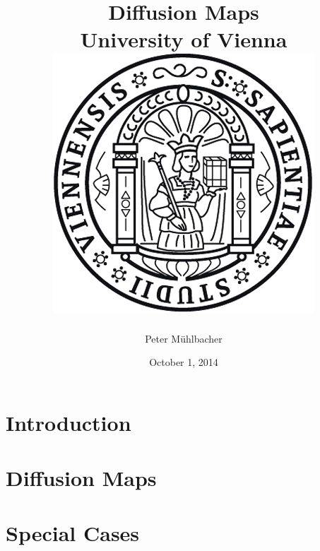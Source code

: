 \documentclass[11pt]{report}
\begin{document}
\title{
	{Diffusion Maps}\\
	{\large University of Vienna}\\
	{\includegraphics{university.png}}
}
\author{Peter Mühlbacher}
\date{October 1, 2014}
\maketitle

\begin{abstract}
\end{abstract}

\tableofcontents

\chapter*{Introduction}


\chapter{Diffusion Maps}


%

\appendix
\chapter{Special Cases}




\end{document}
